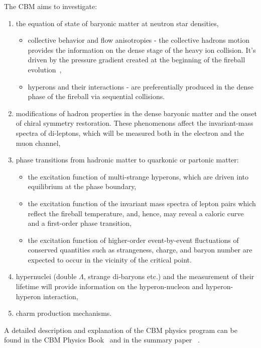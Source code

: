 The \gls{CBM} aims to investigate:
\begin{enumerate}
    \item the equation of state of baryonic matter at neutron star densities,
    \begin{itemize}
        \item collective behavior and flow anisotropies - the collective hadrons motion provides the information on the dense stage of the heavy ion collision. It's driven by the pressure gradient created at the beginning of the fireball evolution~\cite{Reisdorf_2007},
        \item hyperons and their interactions - are preferentially produced in the dense phase of the fireball via sequential collisions.
    \end{itemize}
    \item modifications of hadron properties in the dense baryonic matter and the onset of chiral symmetry restoration. These phenomenons affect the invariant-mass spectra of di-leptons, which will be measured both in the electron and the muon channel,
    \item phase transitions from hadronic matter to quarkonic or partonic matter:
    \begin{itemize}
        \item the excitation function of multi-strange hyperons, which are driven into equilibrium at the phase boundary,
        \item the excitation function of the invariant mass spectra of lepton pairs which reflect the fireball temperature, and, hence, may reveal a caloric curve and a first-order phase transition,
        \item the excitation function of higher-order event-by-event fluctuations of conserved quantities such as strangeness, charge, and baryon number are expected to occur in the vicinity of the critical point.
    \end{itemize}

     
     
    \item hypernuclei (double $\Lambda$, strange di-baryons etc.) and the measurement of their lifetime will provide information on the hyperon-nucleon and hyperon-hyperon interaction,
    \item charm production mechanisms.
\end{enumerate}
A detailed description and explanation of the \gls{CBM} physics program can be found in the \gls{CBM} Physics Book~\cite{CBM_physics} and in the summary paper~
\cite{Ablyazimov_2017}.



